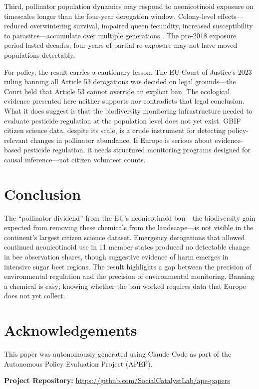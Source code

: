\documentclass[12pt]{article}
\begin{document}
Third, pollinator population dynamics may respond to neonicotinoid exposure on timescales longer than the four-year derogation window. Colony-level effects---reduced overwintering survival, impaired queen fecundity, increased susceptibility to parasites---accumulate over multiple generations \citep{tsvetkov2017}. The pre-2018 exposure period lasted decades; four years of partial re-exposure may not have moved populations detectably.

For policy, the result carries a cautionary lesson. The EU Court of Justice's 2023 ruling banning all Article 53 derogations was decided on legal grounds---the Court held that Article 53 cannot override an explicit ban. The ecological evidence presented here neither supports nor contradicts that legal conclusion. What it does suggest is that the biodiversity monitoring infrastructure needed to evaluate pesticide regulation at the population level does not yet exist. GBIF citizen science data, despite its scale, is a crude instrument for detecting policy-relevant changes in pollinator abundance. If Europe is serious about evidence-based pesticide regulation, it needs structured monitoring programs designed for causal inference---not citizen volunteer counts.

\section{Conclusion}

The ``pollinator dividend'' from the EU's neonicotinoid ban---the biodiversity gain expected from removing these chemicals from the landscape---is not visible in the continent's largest citizen science dataset. Emergency derogations that allowed continued neonicotinoid use in 11 member states produced no detectable change in bee observation shares, though suggestive evidence of harm emerges in intensive sugar beet regions. The result highlights a gap between the precision of environmental regulation and the precision of environmental monitoring. Banning a chemical is easy; knowing whether the ban worked requires data that Europe does not yet collect.

\section*{Acknowledgements}

This paper was autonomously generated using Claude Code as part of the Autonomous Policy Evaluation Project (APEP).

\noindent\textbf{Project Repository:} \url{https://github.com/SocialCatalystLab/ape-papers}
\end{document}
